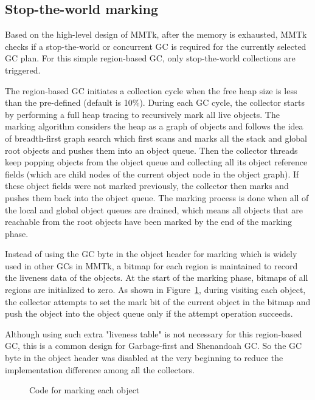 \subsection{Stop-the-world marking}

Based on the high-level design of MMTk, after the memory is exhausted, MMTk checks if a stop-the-world
or concurrent GC is required for the currently selected GC plan.
For this simple region-based GC, only stop-the-world collections are triggered.

The region-based GC initiates a collection cycle when the free heap size is less than
the pre-defined  (default is 10\%). During each GC cycle,
the collector starts by performing a full heap tracing to recursively mark all live objects.
The marking algorithm considers the heap as a graph of objects and follows the idea of breadth-first graph search
which first scans and marks all the stack and global root objects and pushes them into an object queue.
Then the collector threads keep popping objects from the object queue and collecting all its
object reference fields (which are child nodes of the current object node in the object graph).
If these object fields were not marked previously, the collector then marks and pushes them back into the object queue.
The marking process is done when all of the local and global object queues are drained, which means all objects that are reachable
from the root objects have been marked by the end of the marking phase.

Instead of using the GC byte in the object header for marking which is widely used in other GCs in MMTk,
a bitmap for each region is maintained to record the liveness data of the objects.
At the start of the marking phase, bitmaps of all regions are initialized to zero.
As shown in Figure~\ref{fig:tracemarkobject}, during visiting each object, the collector attempts to set the mark bit
of the current object in the bitmap and push the object into the object queue only if the attempt operation succeeds.

Although using such extra "liveness table" is not necessary for this region-based GC,
this is a common design for Garbage-first and Shenandoah GC.
So the GC byte in the object header was disabled at the very beginning to reduce the implementation difference among all the collectors.

\begin{figure}
  \centering
  
  \caption{Code for marking each object}
  \label{fig:tracemarkobject}
\end{figure}

